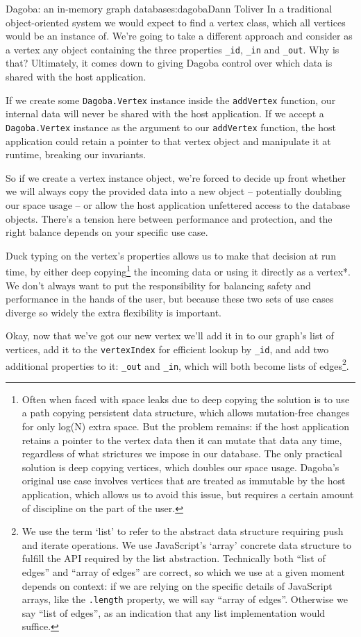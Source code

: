 \begin{aosachapter}{Dagoba: an in-memory graph database}{s:dagoba}{Dann Toliver}
In a traditional object-oriented system we would expect to find a vertex
class, which all vertices would be an instance of. We're going to take a
different approach and consider as a vertex any object containing the
three properties \texttt{\_id}, \texttt{\_in} and \texttt{\_out}. Why is
that? Ultimately, it comes down to giving Dagoba control over which data
is shared with the host application.

If we create some \texttt{Dagoba.Vertex} instance inside the
\texttt{addVertex} function, our internal data will never be shared with
the host application. If we accept a \texttt{Dagoba.Vertex} instance as
the argument to our \texttt{addVertex} function, the host application
could retain a pointer to that vertex object and manipulate it at
runtime, breaking our invariants.

So if we create a vertex instance object, we're forced to decide up
front whether we will always copy the provided data into a new object --
potentially doubling our space usage -- or allow the host application
unfettered access to the database objects. There's a tension here
between performance and protection, and the right balance depends on
your specific use case.

Duck typing on the vertex's properties allows us to make that decision
at run time, by either deep copying\footnote{Often when faced with space
  leaks due to deep copying the solution is to use a path copying
  persistent data structure, which allows mutation-free changes for only
  log(N) extra space. But the problem remains: if the host application
  retains a pointer to the vertex data then it can mutate that data any
  time, regardless of what strictures we impose in our database. The
  only practical solution is deep copying vertices, which doubles our
  space usage. Dagoba's original use case involves vertices that are
  treated as immutable by the host application, which allows us to avoid
  this issue, but requires a certain amount of discipline on the part of
  the user.} the incoming data or using it directly as a vertex*. We
don't always want to put the responsibility for balancing safety and
performance in the hands of the user, but because these two sets of use
cases diverge so widely the extra flexibility is important.

Okay, now that we've got our new vertex we'll add it in to our graph's
list of vertices, add it to the \texttt{vertexIndex} for efficient
lookup by \texttt{\_id}, and add two additional properties to it:
\texttt{\_out} and \texttt{\_in}, which will both become lists of
edges\footnote{We use the term `list' to refer to the abstract data
  structure requiring push and iterate operations. We use JavaScript's
  `array' concrete data structure to fulfill the API required by the
  list abstraction. Technically both ``list of edges'' and ``array of
  edges'' are correct, so which we use at a given moment depends on
  context: if we are relying on the specific details of JavaScript
  arrays, like the \texttt{.length} property, we will say ``array of
  edges''. Otherwise we say ``list of edges'', as an indication that any
  list implementation would suffice.}.


\end{aosachapter}
